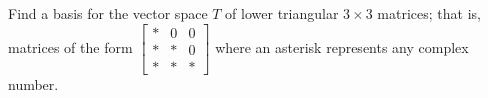 Find a basis for the vector space $T$ of lower triangular $3 \times 3$ matrices;  
that is, matrices of the form 
$\begin{bmatrix} * & 0 & 0\\ * & * & 0\\ * & * & *\end{bmatrix}$ 
where an asterisk represents any complex number.